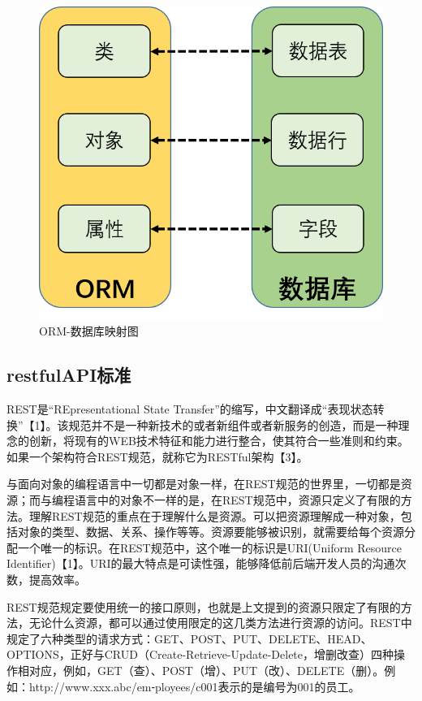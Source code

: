\documentclass[a4paper]{ltxdoc}
\begin{document}
{		\begin{figure}[!htb]
			\centering
			\includegraphics[width=0.5\linewidth]{images/6.png}
			\caption{ORM-数据库映射图}
		\end{figure}
		
		
		\subsection{restfulAPI标准}
		REST是“REpresentational State Transfer”的缩写，中文翻译成“表现状态转换”【1】。该规范并不是一种新技术的或者新组件或者新服务的创造，而是一种理念的创新，将现有的WEB技术特征和能力进行整合，使其符合一些准则和约束。如果一个架构符合REST规范，就称它为RESTful架构【3】。
		
		与面向对象的编程语言中一切都是对象一样，在REST规范的世界里，一切都是资源；而与编程语言中的对象不一样的是，在REST规范中，资源只定义了有限的方法。理解REST规范的重点在于理解什么是资源。可以把资源理解成一种对象，包括对象的类型、数据、关系、操作等等。资源要能够被识别，就需要给每个资源分配一个唯一的标识。在REST规范中，这个唯一的标识是URI(Uniform Resource Identifier)【1】。URI的最大特点是可读性强，能够降低前后端开发人员的沟通次数，提高效率。
		
		REST规范规定要使用统一的接口原则，也就是上文提到的资源只限定了有限的方法，无论什么资源，都可以通过使用限定的这几类方法进行资源的访问。REST中规定了六种类型的请求方式：GET、POST、PUT、DELETE、HEAD、OPTIONS，正好与CRUD（Create-Retrieve-Update-Delete，增删改查）四种操作相对应，例如，GET（查）、POST（增）、PUT（改）、DELETE（删）。例如：http://www.xxx.abc/em⁃ployees/c001表示的是编号为001的员工。
		
		
		
}
\end{document}
